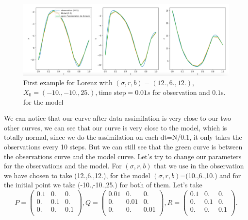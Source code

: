 \begin{figure}[H]
    \centering
		\includegraphics[width=1\textwidth]{"images/enkf/lorenz1_b.png"}
		\caption{First example for Lorenz with $(\sigma, r, b)=(12.,6.,12.)$, $X_0=(-10.,-10.,25.),\text{time step}=0.01s$ for observation and $0.1$s. for the model}
\end{figure}
\noindent We can notice that our curve after data assimilation is very close to our two other curves, we can see that our curve is very close to the model, which is totally normal, since we do the assimilation on each dt=N/0.1, it only takes the observations every 10 steps. But we can still see that the green curve is between the observations curve and the model curve.
\noindent \newline Let's try to change our parameters for the observations and the model. For $(\sigma, r, b)$ that we use in the observation we have chosen to take (12.,6.,12.), for the model $(\sigma, r, b)$=(10.,6.,10.) and for the initial point we take (-10.,-10.,25.) for both of them.
\noindent\newline Let's take 
			$$P=\begin{pmatrix}
            0.1 & 0. & 0. \\
            0. & 0.1 & 0. \\
            0. & 0. & 0.1 \\
            \end{pmatrix} ,
            Q=\begin{pmatrix}
            0.01 & 0. & 0. \\
            0. & 0.01 & 0. \\
            0. & 0. & 0.01 \\
            \end{pmatrix},
            R=\begin{pmatrix}
            0.1 & 0. & 0. \\
            0. & 0.1 & 0. \\
            0. & 0. & 0.1 \\
            \end{pmatrix}.$$ 
